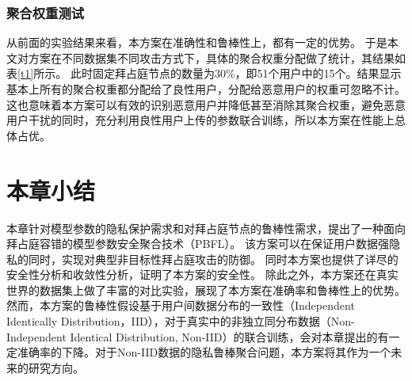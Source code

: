 \subsubsection{聚合权重测试}
从前面的实验结果来看，本方案在准确性和鲁棒性上，都有一定的优势。
于是本文对方案在不同数据集不同攻击方式下，具体的聚合权重分配做了统计，其结果如表\ref{t1}所示。
此时固定拜占庭节点的数量为$30\%$，即51个用户中的15个。结果显示基本上所有的聚合权重都分配给了良性用户，分配给恶意用户的权重可忽略不计。
这也意味着本方案可以有效的识别恶意用户并降低甚至消除其聚合权重，避免恶意用户干扰的同时，充分利用良性用户上传的参数联合训练，所以本方案在性能上总体占优。

\begin{table}[htbp]
	\begin{center}
		\caption{PBFL中不同类型节点的聚合权重}
		\label{t1}
		\end{center}
	\end{table}

\section{本章小结}\label{con}
本章针对模型参数的隐私保护需求和对拜占庭节点的鲁棒性需求，提出了一种面向拜占庭容错的模型参数安全聚合技术（PBFL）。
该方案可以在保证用户数据强隐私的同时，实现对典型非目标性拜占庭攻击的防御。
同时本方案也提供了详尽的安全性分析和收敛性分析，证明了本方案的安全性。
除此之外，本方案还在真实世界的数据集上做了丰富的对比实验，展现了本方案在准确率和鲁棒性上的优势。
然而，本方案的鲁棒性假设基于用户间数据分布的一致性（Independent Identically Distribution，IID），对于真实中的非独立同分布数据（Non-Independent Identical Distribution, Non-IID）的联合训练，会对本章提出的有一定准确率的下降。对于Non-IID数据的隐私鲁棒聚合问题，本方案将其作为一个未来的研究方向。